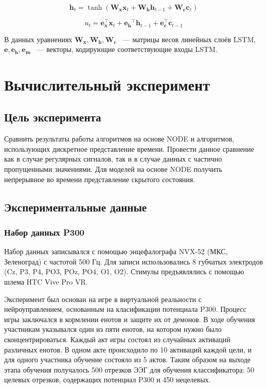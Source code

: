 \documentclass{article}
\begin{document}
$$
\mathbf{h}_{t}=\tanh\left(\mathbf{W}_{\mathbf{x}} \mathbf{x}_{t}+\mathbf{W}_{\mathbf{h}} \mathbf{h}_{t-1}+\mathbf{W}_{\mathbf{c}} \mathbf{c}_{t}\right)
$$

$$
u_{t}=\mathbf{e}_{\mathbf{x}}^{\top} \mathbf{x}_{t}+\mathbf{e}_{\mathbf{h}}{ }^{\top} \mathbf{h}_{t-1}+\mathbf{e}_{\mathbf{c}}^{\top} \mathbf{c}_{t-1}
$$

В данных уравнениях $\mathbf{W}_{\mathbf{x}}, \mathbf{W}_{\mathbf{h}}, \mathbf{W}_{\mathbf{c}}$ ~--- матрицы весов линейных слоёв LSTM,  $\mathbf{e}, \mathbf{e}_{\mathbf{h}}, \mathbf{e}_{\mathbf{m}}$ ~--- векторы, кодирующие соответствующие входы LSTM.



\section{Вычислительный эксперимент}

\subsection{Цель эксперимента}

Сравнить результаты работы алгоритмов на основе NODE и алгоритмов, использующих дискретное представление времени. Провести данное сравнение как в случае регулярных сигналов, так и в случае данных с частично пропущенными значениями. Для моделей на основе NODE получить непрерывное во времени представление скрытого состояния.

\subsection{Экспериментальные данные}

\subsubsection{Набор данных P300}

Набор данных записывался с помощью энцефалографа NVX-52 (МКС, Зеленоград) с частотой 500 Гц. Для записи использовались 8 губчатых электродов (Cz, P3, P4, PO3, POz, PO4, O1, O2). Стимулы предъявлялись
с помощью шлема HTC Vive Pro VR.

Эксперимент был основан на игре в виртуальной реальности с нейроуправлением, основанным на класификации потенциала P300. Процесс игры заключался в кормлении енотов и защите их от демонов. В ходе обучения участникам указывался один из пяти енотов, на котором нужно было сконцентрироваться. Каждый акт игры состоял из случайных активаций различных енотов. В одном акте происходило по 10 активаций каждой цели, и для одного участника обучение состояло из 5 актов. Таким образом на выходе этапа обучения получалось 500 отрезков ЭЭГ для обучения классификатора: 50 целевых отрезков, содержащих потенциал P300 и 450 нецелевых.
\end{document}
